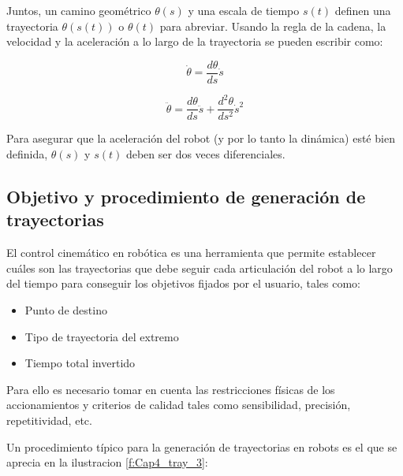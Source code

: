     Juntos, un camino geométrico $\theta(s)$ y una escala de tiempo $s(t)$  definen una trayectoria $\theta(s(t))$  o $\theta(t)$   para abreviar. Usando la regla de la cadena, la velocidad y la aceleración a lo largo de la trayectoria se pueden escribir como:


    \begin{equation}
        \dot{\theta} = \frac{d\theta}{ds} \dot{s}
        \label{eq:cap4_tray_7}
    \end{equation}  
    
        \begin{equation}
        \ddot{\theta} = \frac{d\theta}{ds} \ddot{s} + \frac{d^2\theta}{ds^2} \dot{s}^2
        \label{eq:cap4_tray_8}
    \end{equation}


    Para asegurar que la aceleración del robot (y por lo tanto la dinámica) esté bien definida, $\theta(s)$ y $s(t)$ deben ser dos veces diferenciales.

    \newpage
    
    \subsection{Objetivo y procedimiento de generación de trayectorias}
    
    El control cinemático en robótica es una herramienta que permite establecer cuáles son las trayectorias que debe seguir cada articulación del robot a lo largo del tiempo para conseguir los objetivos fijados por el usuario, tales como:
    
    \begin{itemize}
        \item 	Punto de destino
         \item  Tipo de trayectoria del extremo
         \item  Tiempo total invertido

    \end{itemize}
    
    
    Para ello es necesario tomar en cuenta las restricciones físicas de los accionamientos y criterios de calidad tales como sensibilidad, precisión, repetitividad, etc.
    
    Un procedimiento típico para la generación de trayectorias en robots es el que se aprecia en la ilustracion \ref{f:Cap4_tray_3}:
    
